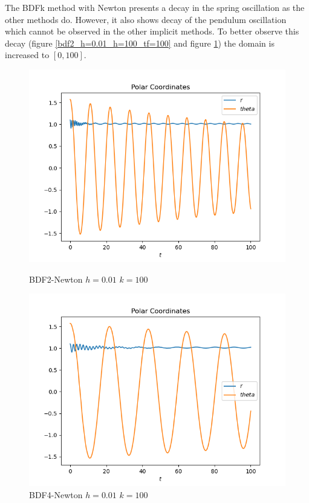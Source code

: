 \documentclass{report}
\begin{document}
The BDFk method with Newton presents a decay in the spring oscillation as the other methods do.
However, it also shows decay of the pendulum oscillation which cannot be observed in the other implicit methods.
To better observe this decay (figure \ref{bdf2_h=0.01_h=100_tf=100} and figure \ref{bdf4_h=0.01_h=100_tf=100.png}) the domain is increased to $[0, 100]$.

\begin{figure}[h]
\centering
\begin{minipage}[b]{0.45\textwidth}
\centering
\includegraphics[width=\textwidth]{../Plots/BDFk/bdf2_h=0.01_h=100_tf=100}
\caption{BDF2-Newton $h=0.01$ $k=100$}
\label{bdf2_h=0.01_h=100_tf=100}
\end{minipage}
\hfill
\begin{minipage}[b]{0.45\textwidth}
\centering
\includegraphics[width=\textwidth]{../Plots/BDFk/bdf4_h=0.01_h=100_tf=100}
\caption{BDF4-Newton $h=0.01$ $k=100$}
\label{bdf4_h=0.01_h=100_tf=100.png}
\end{minipage}
\end{figure}
\end{document}
